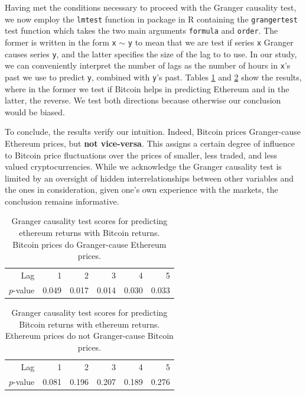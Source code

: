 \documentclass[twoside]{report}
\newcommand{\code}{\texttt}
\begin{document}
\begin{spacing}{1}
Having met the conditions necessary to proceed with the Granger causality test, we now employ the \code{lmtest} function in package in R containing the \code{grangertest} test function which takes the two main arguments \code{formula} and \code{order}. The former is written in the form \code{x} $\sim$ \code{y} to mean that we are test if series \code{x} Granger causes series \code{y}, and the latter specifies the size of the lag to to use. In our study, we can conveniently interpret the number of lags as the number of hours in \code{x}'s past we use to predict \code{y}, combined with \code{y}'s past. Tables \ref{tab:btc_cause_eth} and \ref{tab:eth_cause_btc} show the results, where in the former we test if Bitcoin helps in predicting Ethereum and in the latter, the reverse. We test both directions because otherwise our conclusion would be biased. 

To conclude, the results verify our intuition. Indeed, Bitcoin prices Granger-cause Ethereum prices, but \textbf{not vice-versa}. This assigns a certain degree of influence to Bitcoin price fluctuations over the prices of smaller, less traded, and less valued cryptocurrencies. While we acknowledge the Granger causality test is limited by an oversight of hidden interrelationships between other variables and the ones in consideration, given one's own experience with the markets, the conclusion remains informative.    

\begin{table}[!htbp]
\centering
\begin{tabular}{rrrrrr}
  \hline
 Lag & 1 & 2 & 3 & 4 & 5 \\ 
  $p$-value & 0.049 & 0.017 & 0.014 & 0.030 & 0.033 \\ 
   \hline
\end{tabular}
\caption{Granger causality test scores for predicting ethereum returns with Bitcoin returns. Bitcoin prices do Granger-cause Ethereum prices.} \label{tab:btc_cause_eth}
\end{table}

\begin{table}[!htbp]
\centering
\begin{tabular}{rrrrrr}
  \hline
 Lag & 1 & 2 & 3 & 4 & 5 \\ 
  $p$-value & 0.081 & 0.196 & 0.207 & 0.189 & 0.276 \\ 
   \hline
\end{tabular}
\caption{Granger causality test scores for predicting Bitcoin returns with ethereum returns. Ethereum prices do not Granger-cause Bitcoin prices.} \label{tab:eth_cause_btc}
\end{table}


\end{spacing}
\end{document}
